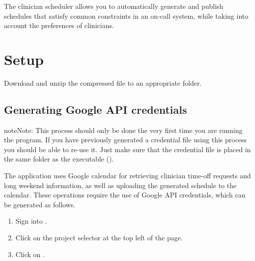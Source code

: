 \documentclass[letterpaper,10pt,english]{sphinxmanual}
\begin{document}
The clinician scheduler allows you to automatically generate and publish
schedules that satisfy common constraints in an on-call system, while taking
into account the preferences of clinicians.


\chapter{Setup}
\label{\detokenize{index:setup}}
Download and unzip the compressed file to an appropriate folder.


\section{Generating Google API credentials}
\label{\detokenize{index:generating-google-api-credentials}}
\begin{sphinxadmonition}{note}{Note:}
This process should only be done the very first time you are running
the program. If you have previously generated a credential file using
this process you should be able to re-use it. Just make sure that the
credential file is placed in the same folder as the executable ().
\end{sphinxadmonition}

The application uses Google calendar for retrieving clinician
time-off requests and long weekend information, as well as uploading the
generated schedule to the calendar. These operations require the use
of Google API credentials, which can be generated as follows.
\begin{enumerate}
\item {} 
Sign into .

\item {} 
Click on the project selector at the top left of the page.

\end{enumerate}

\begin{figure}[htbp]
\centering
{}\end{figure}

\begin{DUlineblock}{0em}
\item[] 
\end{DUlineblock}
\begin{enumerate}
\setcounter{enumi}{2}
\item {} 
Click on .

\end{enumerate}
\end{document}
